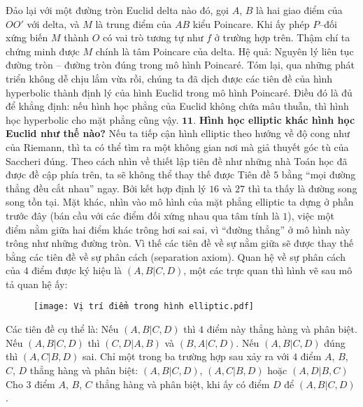 \documentclass{article}
\begin{document}
	\vskip 0.1cm
	Đảo lại với một đường tròn Euclid delta nào đó, gọi $A$, $B$ là hai giao điểm của $OO'$ với delta, và $M$ là trung điểm của $AB$ kiểu Poincare. Khi ấy phép $P$--đối xứng biến $M$ thành $O$ có vai trò tương tự như $f$ ở trường hợp trên. Thậm chí ta chứng minh được $M$ chính là tâm Poincare của delta.
	\vskip 0.1cm
	Hệ quả: Nguyên lý liên tục đường tròn -- đường tròn đúng trong mô hình Poincaré.
	\vskip 0.1cm
	Tóm lại, qua những phát triển không dễ chịu lắm vừa rồi, chúng ta đã dịch được các tiên đề của hình hyperbolic thành định lý của hình Euclid trong mô hình Poincaré. Điều đó là đủ để khẳng định: nếu hình học phẳng của Euclid không chứa mâu thuẫn, thì hình học hyperbolic cho mặt phẳng cũng vậy.
	\vskip 0.1cm	
	$\pmb{11.}$ \textbf{\color{lichsutoanhoc}Hình học elliptic khác hình học Euclid như thế nào?}
	\vskip 0.1cm
	Nếu ta tiếp cận hình elliptic theo hướng về độ cong như của Riemann, thì ta có thể tìm ra một không gian nơi mà giả thuyết góc tù của Saccheri đúng. Theo cách nhìn về thiết lập tiên đề như những nhà Toán học đã được đề cập phía trên, ta sẽ không thể thay thế được Tiên đề $5$ bằng ``mọi đường thẳng đều cắt nhau'' ngay. Bởi kết hợp định lý $16$ và $27$ thì ta thấy là đường song song tồn tại. Mặt khác, nhìn vào mô hình của mặt phẳng elliptic ta dựng ở phần trước đây (bán cầu với các điểm đối xứng nhau qua tâm tính là $1$), việc một điểm nằm giữa hai điểm khác trông hơi sai sai, vì ``đường thẳng'' ở mô hình này trông như những đường tròn. Vì thế các tiên đề về sự nằm giữa sẽ được thay thế bằng các tiên đề về sự phân cách (separation axiom). Quan hệ về sự phân cách của $4$ điểm được ký hiệu là $(A, B | C, D)$, một các trực quan thì hình vẽ sau mô tả quan hệ ấy:
	\begin{figure}[H]
		\vspace*{-5pt}
		\centering
		\captionsetup{labelformat= empty, justification=centering}
		\texttt{[image: Vị trí điểm trong hình elliptic.pdf]}
		\vspace*{-10pt}
	\end{figure}
	Các tiên đề cụ thể là:
	Nếu $(A, B | C, D)$ thì $4$ điểm này thẳng hàng và phân biệt.
	\vskip 0.1cm
	Nếu $(A, B | C, D)$ thì $(C, D | A, B)$ và $(B, A | C, D)$.
	\vskip 0.1cm
	Nếu $(A, B | C, D)$ đúng thì $(A, C | B, D)$ sai.
	\vskip 0.1cm
	Chỉ một trong ba trường hợp sau xảy ra với $4$ điểm $A$, $B$, $C$, $D$ thẳng hàng và phân biệt: $(A, B | C, D)$, $(A, C | B, D)$ hoặc $(A, D | B, C)$
	\vskip 0.1cm
	Cho $3$ điểm $A$, $B$, $C$ thẳng hàng và phân biệt, khi ấy có điểm $D$ để $(A, B | C, D)$.
\end{document}
